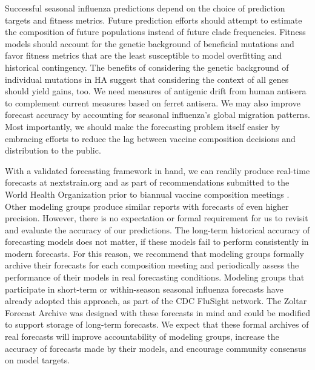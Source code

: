 Successful seasonal influenza predictions depend on the choice of prediction targets and fitness metrics.
Future prediction efforts should attempt to estimate the composition of future populations instead of future clade frequencies.
Fitness models should account for the genetic background of beneficial mutations and favor fitness metrics that are the least susceptible to model overfitting and historical contingency.
The benefits of considering the genetic background of individual mutations in HA suggest that considering the context of all genes should yield gains, too.
We need measures of antigenic drift from human antisera to complement current measures based on ferret antisera.
We may also improve forecast accuracy by accounting for seasonal influenza's global migration patterns.
Most importantly, we should make the forecasting problem itself easier by embracing efforts to reduce the lag between vaccine composition decisions and distribution to the public.

With a validated forecasting framework in hand, we can readily produce real-time forecasts at nextstrain.org and as part of recommendations submitted to the World Health Organization prior to biannual vaccine composition meetings \cite{Bedford780627}.
Other modeling groups produce similar reports with forecasts of even higher precision.
However, there is no expectation or formal requirement for us to revisit and evaluate the accuracy of our predictions.
The long-term historical accuracy of forecasting models does not matter, if these models fail to perform consistently in modern forecasts.
For this reason, we recommend that modeling groups formally archive their forecasts for each composition meeting and periodically assess the performance of their models in real forecasting conditions.
Modeling groups that participate in short-term or within-season seasonal influenza forecasts have already adopted this approach, as part of the CDC FluSight network.
The Zoltar Forecast Archive \citep{reich2020zoltar} was designed with these forecasts in mind and could be modified to support storage of long-term forecasts.
We expect that these formal archives of real forecasts will improve accountability of modeling groups, increase the accuracy of forecasts made by their models, and encourage community consensus on model targets.
